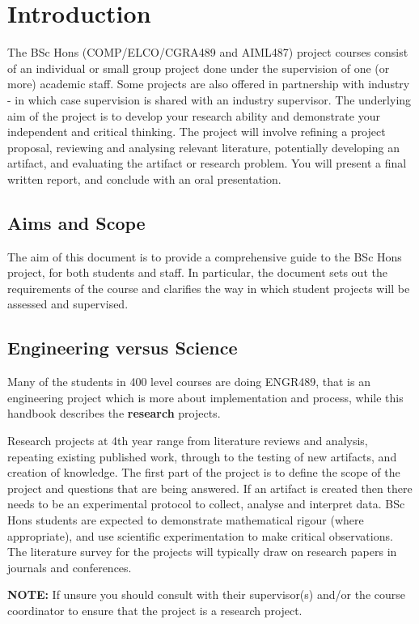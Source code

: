 \chapter{Introduction}
The BSc Hons (COMP/ELCO/CGRA489 and AIML487) project courses consist of an individual or small 
group project
done under the supervision of one (or more) academic staff.  Some projects
are also offered in partnership with industry - in which case
supervision is shared with an industry supervisor.     The underlying
aim of the project is to develop your research ability and demonstrate your independent  
and critical thinking.  The project will involve refining a project proposal, reviewing and analysing relevant literature, potentially developing an artifact, and evaluating the artifact or research problem.  
You will present a final written report, and conclude with
an oral presentation.

\section{Aims and Scope}
The aim of this document is to provide a comprehensive guide to the BSc Hons  project, for both students and staff. In
particular, the document sets out the requirements of the course and clarifies the way in which student projects 
will be assessed and supervised.

\section{Engineering versus Science}
Many of the students in 400 level courses are doing ENGR489, that is an engineering project which is more about implementation and process, while this handbook describes the
\textbf{research} projects.

Research projects at 4th year range from literature reviews and analysis, repeating existing published work, through to the testing of new artifacts, and creation of knowledge.  The first part of the project is to define the scope of the project and questions that are being answered.
If an artifact is created then there needs to be an experimental protocol to collect, 
analyse and interpret data. BSc Hons students are expected to
  demonstrate mathematical rigour (where appropriate), and use
  scientific experimentation to make critical observations. The literature
  survey for the projects will typically draw on research papers in journals
  and conferences.

{\bf NOTE:} If unsure you should consult with their supervisor(s) and/or
the course coordinator to ensure that the project is a research project.

